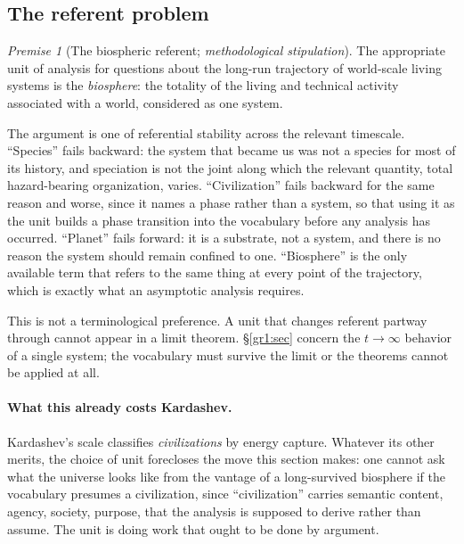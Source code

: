 \documentclass[11pt]{article}
\numberwithin{equation}{section}
\theoremstyle{plain}
\theoremstyle{definition}
\theoremstyle{remark}
\newtheorem{premise}{Premise}
\begin{document}
\subsection{The referent problem}\label{gr:sub:referent}

\begin{premise}[The biospheric referent; \emph{methodological
stipulation}]\label{gr:phi1}
The appropriate unit of analysis for questions about the long-run
trajectory of world-scale living systems is the \emph{biosphere}: the
totality of the living and technical activity associated with a world,
considered as one system.
\end{premise}

The argument is one of referential stability across the relevant
timescale. ``Species'' fails backward: the system that became us was
not a species for most of its history, and speciation is not the joint
along which the relevant quantity, total hazard-bearing organization, varies. ``Civilization'' fails backward for the same reason and
worse, since it names a phase rather than a system, so that using it as
the unit builds a phase transition into the vocabulary before any
analysis has occurred. ``Planet'' fails forward: it is a substrate, not
a system, and there is no reason the system should remain confined to
one. ``Biosphere'' is the only available term that refers to the same
thing at every point of the trajectory, which is exactly what an
asymptotic analysis requires.

This is not a terminological preference. A unit that changes referent
partway through cannot appear in a limit theorem. \S\ref{gr1:sec} concern
the $t\to\infty$ behavior of a single system; the vocabulary must
survive the limit or the theorems cannot be applied at all.

\paragraph{What this already costs Kardashev.}\label{gr:rem:kardvocab}
Kardashev's scale \cite{Kar64} classifies \emph{civilizations} by energy
capture. Whatever its other merits, the choice of unit forecloses the
move this section makes: one cannot ask what the universe looks like
from the vantage of a long-survived biosphere if the vocabulary presumes
a civilization, since ``civilization'' carries semantic content, agency, society, purpose, that the analysis is supposed to derive
rather than assume. The unit is doing work that ought to be done by
argument.
\end{document}

